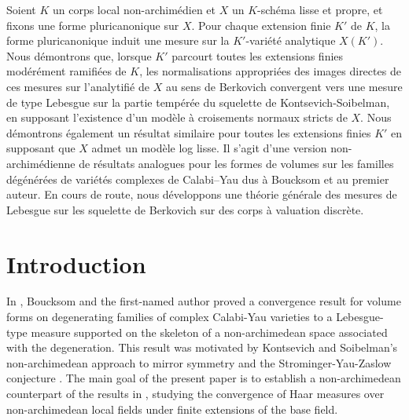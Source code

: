 \documentclass[JEP,XML,SOM,Unicode,NoFloatCountersInSection]{cedram}
\theoremstyle{definition}
\numberwithin{equation}{subsection}
\begin{document}




\begin{altabstract}
Soient $K$ un corps local non-archimédien et $X$ un $K$-schéma lisse et propre, et fixons une forme pluricanonique sur $X$. Pour chaque extension finie $K'$ de $K$, la forme pluricanonique induit une mesure sur la $K'$-variété analytique $X(K')$. Nous démontrons que, lorsque $K'$ parcourt toutes les extensions finies modérément ramifiées de $K$, les normalisations appropriées des images directes de ces mesures sur l'analytifié de $X$ au sens de Berkovich convergent vers une mesure de type Lebesgue sur la partie tempérée du squelette de Kontsevich-Soibelman, en supposant l'existence d'un modèle à croisements normaux stricts de $X$. Nous démontrons également un résultat similaire pour toutes les extensions finies $K'$ en supposant que $X$ admet un modèle log lisse. Il s'agit d'une version non-archimédienne de résultats analogues pour les formes de volumes sur les familles dégénérées de variétés complexes de Calabi--Yau dus à Boucksom et au premier auteur. En cours de route, nous développons une théorie générale des mesures de Lebesgue sur les squelette de Berkovich sur des corps à valuation discrète.
\end{altabstract}

\maketitle
\tableofcontents
\mainmatter

\vspace*{-2.3\baselineskip}\vskip0pt\enlargethispage{.5\baselineskip}%
\section{Introduction}\label{sec:intro}

In \cite{BJ}, Boucksom and the first-named author proved a convergence result for volume forms on degenerating families of complex Calabi-Yau varieties to a Lebesgue-type measure supported on the skeleton of a non-archimedean space associated with the degeneration. This result was motivated by Kontsevich and Soibelman's non-archimedean approach to mirror symmetry and the Strominger-Yau-Zaslow conjecture \cite{KS}. The main goal of the present paper is to establish a non-archimedean counterpart of the results in \cite{BJ}, studying the convergence of Haar measures over non-archimedean local fields under finite extensions of the base field.
\end{document}
